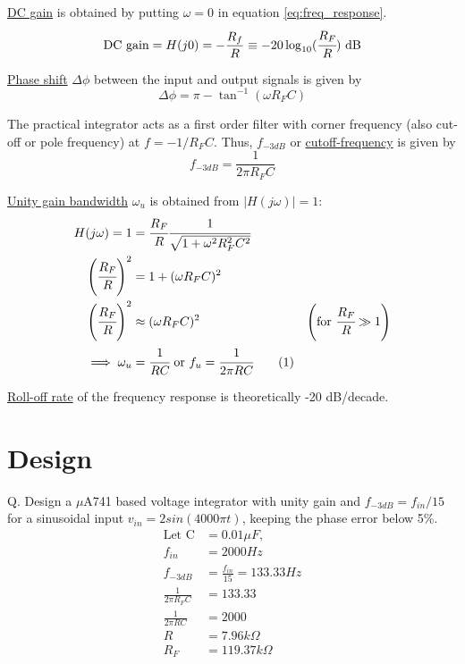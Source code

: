 \documentclass[12pt, titlepage]{article}
\theoremstyle{definition}
\newcommand\numberthis{\addtocounter{equation}{1}\tag{\theequation}}
\begin{document}
    \underline{DC gain} is obtained by putting $\omega = 0$ in equation \ref{eq:freq_response}.
    \begin{equation}
      \text{DC gain} = H(j0) = -\frac{R_f}{R} \equiv -20\log_{10}(\cfrac{R_F}{R}) \text{ dB}
    \end{equation}

    \underline{Phase shift} $\Delta\phi$ between the input and output signals is given by
    \begin{equation}\label{eq:phase_shift}
      \Delta\phi = \pi - \tan^{-1}(\omega R_FC)
    \end{equation}

    The practical integrator acts as a first order filter with corner frequency (also cut-off or pole frequency) at $f = -1/R_FC$.
    Thus, \underline{$f_{-3dB}$} or \underline{cutoff-frequency} is given by
    \begin{equation}\label{eq:f3db}
      f_{-3dB} = \frac{1}{2\pi R_FC}
    \end{equation}

    \underline{Unity gain bandwidth} $\omega_u$ is obtained from $|H(j\omega)| = 1$:
    \begin{align*}
      H(j\omega) = 1 &= \cfrac{R_{F}}{R}\cfrac{1}{\sqrt{1+\omega^{2}R_{F}^{2}C^{2}}} \\
      \left(\cfrac{R_F}{R}\right)^2 &= 1 + (\omega R_FC)^2 \\
      \left(\cfrac{R_F}{R}\right)^2 &\approx (\omega R_FC)^2 & \left(\text{for } \cfrac{R_F}{R} \gg 1\right)\\
      \implies \omega_u &= \cfrac{1}{RC} \text{ or } f_u = \cfrac{1}{2\pi RC}\numberthis \label{eq:unity_gain_bw}
    \end{align*}

    \underline{Roll-off rate} of the frequency response is theoretically -20 dB/decade.

  \newpage
  \section{Design}
    Q. Design a $\mu$A741 based voltage integrator with unity gain and
    $f_{-3dB} = f_{in}/15$ for a sinusoidal input
    $v_{in} = 2 sin(4000\pi t)$, keeping the phase error below 5\%.
    \begin{align*}
        \text{Let C} \! &=0.01\mu F , \\
        f_{in} &=2000 Hz\\
        f_{-3dB} &=\frac{f_{in}}{15} = 133.33 Hz \\
        \frac{1}{2\pi R_{F}C} &= 133.33\\
        \frac{1}{2\pi RC} &= 2000\\
        R &=7.96k\Omega\\
        R_{F} &=119.37k\Omega\\
    \end{align*}
\end{document}
